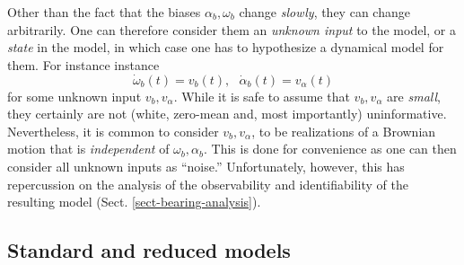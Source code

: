\documentclass[]{article}
\def\w{\omega}
\begin{document}
Other than the fact that the biases $\alpha_b, \w_b$ change {\em slowly}, they can change arbitrarily. One can therefore consider them an {\em unknown input} to the model, or a {\em state} in the model, in which case one has to hypothesize a dynamical model for them. For instance instance
\begin{equation}
\dot \w_b(t) = v_b(t), ~~~ \dot \alpha_b(t) = v_\alpha(t)
\end{equation}
for some unknown input $v_b, v_\alpha$. While it is safe to assume that $v_b, v_\alpha$ are {\em small}, they certainly are not (white, zero-mean and, most importantly) uninformative. Nevertheless, it is common to consider $v_b, v_\alpha$, to be realizations of a Brownian motion that is  {\em independent} of $\w_b, \alpha_b$. This is done for convenience as one can then consider all unknown inputs as ``noise.'' Unfortunately, however, this has repercussion on the analysis of the observability and identifiability of the resulting model (Sect. \ref{sect-bearing-analysis}).


\subsection{Standard and reduced models}
\end{document}
